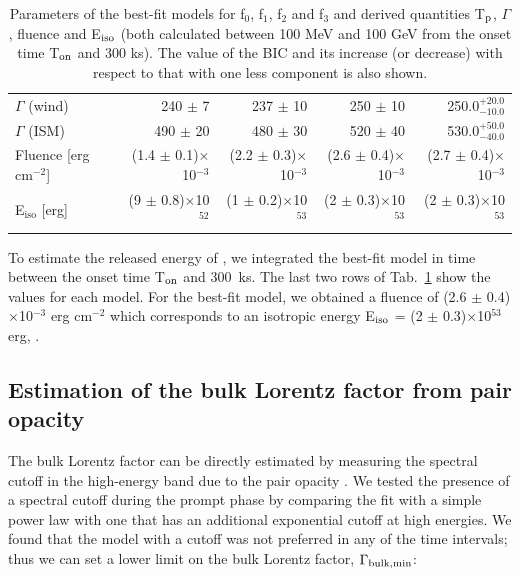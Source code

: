 \documentclass[preprint]{aastex631}
\begin{document}
\begin{table}[h!]
\begin{tabular}{l| r | r | r |  r }
$\Gamma$ (wind)                     & 240 $\pm$ 7                       & 237 $\pm$ 10                          & 250 $\pm$ 10                              & 250.0$^{+20.0}_{-10.0}$                   \\
$\Gamma$ (ISM)                      & 490 $\pm$ 20                      & 480 $\pm$ 30                          & 520 $\pm$ 40                              & 530.0$^{+50.0}_{-40.0}$                   \\
Fluence [erg cm$^{-2}$]             & (1.4 $\pm$ 0.1)$\times$10$^{-3}$ & (2.2 $\pm$ 0.3)$\times$10$^{-3}$     & (2.6 $\pm$ 0.4)$\times$10$^{-3}$         & (2.7 $\pm$ 0.4)$\times$10$^{-3}$         \\
E$_\mathrm{iso}$ [erg]                          & (9 $\pm$ 0.8)$\times$10$^{52}$   & (1 $\pm$ 0.2)$\times$10$^{53}$       & (2 $\pm$ 0.3)$\times$10$^{53}$           & (2 $\pm$ 0.3)$\times$10$^{53}$           \\

 \hline
    \end{tabular}
    \caption{Parameters of the best-fit models for f$_{0}$, f$_{1}$, f$_{2}$ and f$_{3}$ and derived quantities T$_{\rm p}$, $\Gamma$, fluence and E$_{\rm iso}$ (both calculated between 100 MeV and 100 GeV from the onset time T$_{\rm on}$ and 300 ks). 
    The value of the BIC and its increase (or decrease) with respect to that with one less component is also shown.}
    \label{tab:model}
    \end{table}

To estimate the released energy of \grb, we integrated the best-fit model in time between the onset time T$_{\rm on}$ and 300~ks. The last two rows of Tab.~\ref{tab:model} show the values for each model. For the best-fit model, we obtained a fluence of (2.6 $\pm$ 0.4)$\times$10$^{-3}$ erg cm$^{-2}$ which corresponds to an isotropic energy E$_{\rm iso}$ = (2 $\pm$ 0.3)$\times$10$^{53}$ erg, .

\subsection{Estimation of the bulk Lorentz factor from pair opacity}
\label{sec:gamma}
The bulk Lorentz factor can be directly estimated by measuring the spectral cutoff in the high-energy band due to the pair opacity \citep{2018ApJ...864..163V,2020ApJ...890....9A,2020ApJ...891..106A}. 
We tested the presence of a spectral cutoff during the prompt phase by comparing the fit with a simple power law with one that has an additional exponential cutoff at high energies. We found that the model with a cutoff was not preferred in any of the time intervals; thus we can set a lower limit on the bulk Lorentz factor, $\Gamma_{\rm bulk,min}$:
\end{document}
